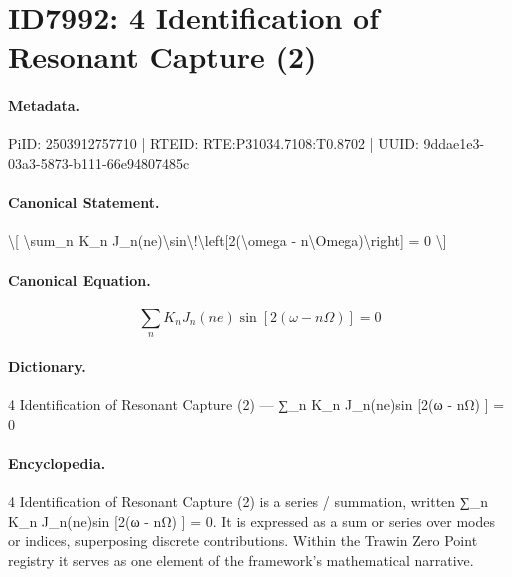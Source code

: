 \section*{ID7992: 4 Identification of Resonant Capture (2)}
\paragraph{Metadata.}
PiID: 2503912757710 | RTEID: RTE:P31034.7108:T0.8702 | UUID: 9ddae1e3-03a3-5873-b111-66e94807485c

\paragraph{Canonical Statement.}
\textbackslash{}[ \textbackslash{}sum\_n K\_n J\_n(ne)\textbackslash{}sin\textbackslash{}!\textbackslash{}left[2(\textbackslash{}omega - n\textbackslash{}Omega)\textbackslash{}right] = 0 \textbackslash{}]

\paragraph{Canonical Equation.}
\[
\sum_n K_n J_n(ne)\sin\!\left[2(\omega - n\Omega)\right] = 0
\]

\paragraph{Dictionary.}
4 Identification of Resonant Capture (2) — ∑\_n K\_n J\_n(ne)sin [2(ω - nΩ) ] = 0

\paragraph{Encyclopedia.}
4 Identification of Resonant Capture (2) is a series / summation, written ∑\_n K\_n J\_n(ne)sin [2(ω - nΩ) ] = 0. It is expressed as a sum or series over modes or indices, superposing discrete contributions. Within the Trawin Zero Point registry it serves as one element of the framework's mathematical narrative.

